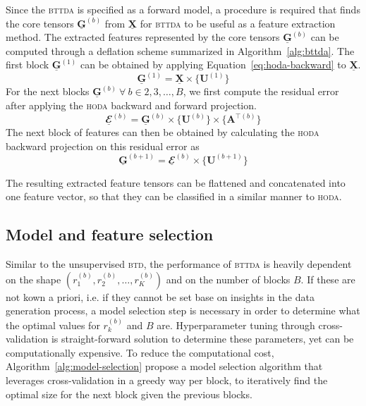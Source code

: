 \documentclass[twocolumn]{article}
\newcommand{\ten}[1]{\underline{\mathbf{#1}}} %
\newcommand{\mat}[1]{\mathbf{#1}} %
\newcommand{\mmpr}[1]{\times\{#1\}} %
\begin{document}
Since the \textsc{bttda} is specified as a forward model, a procedure is
required that finds the core tensors $\ten{G}^(b)$ from $\ten{X}$ for
\textsc{bttda} to be useful as a feature extraction method.
The extracted features represented by the core tensors $\ten{G}^{(b)}$ can be
computed through a deflation scheme summarized in Algorithm~\ref{alg:bttda}.
The first block $\ten{G}^{(1)}$ can be obtained by applying
Equation~\ref{eq:hoda-backward} to $\ten{X}$.
\begin{equation}
  \ten{G}^{(1)} = \ten{X}\mmpr{\mat{U}^{(1)}}
\end{equation}
For the next blocks $\ten{G}^{(b)}~\forall~ b\in2,3,\ldots,B$, we first compute
the residual error after applying the \textsc{hoda} backward and forward
projection.
\begin{equation}
  \ten{\mathbfcal{E}}^{(b)} =
  \ten{G}^{(b)}\mmpr{\mat{U}^{(b)}}\mmpr{\mat{A}^{\intercal(b)}}
\end{equation}
The next block of features can then be obtained by calculating the
\textsc{hoda} backward projection on this residual error as
\begin{equation}
  \ten{G}^{(b+1)} = \ten{\mathbfcal{E}}^{(b)}\mmpr{\mat{U}^{(b+1)}}
\end{equation}

The resulting extracted feature tensors can be flattened and concatenated into
one feature vector, so that they can be classified in a similar manner to
\textsc{hoda}.


\subsection{Model and feature selection}
Similar to the unsupervised \textsc{btd}, the performance of \textsc{bttda} is
heavily dependent on the shape $\left(r_1^{(b)}, r_2^{(b)}, \ldots,
r_K^{(b)}\right)$ and on the number of blocks $B$.
If these are not kown a priori, i.e. if they cannot be set base on insights in the
data generation process, a model selection step is necessary in order to
determine what the optimal values for $r_k^{(b)}$ and $B$ are.
Hyperparameter tuning through cross-validation is straight-forward solution to
determine these parameters, yet can be computationally expensive.
To reduce the computational cost, Algorithm~\ref{alg:model-selection} propose a model selection algorithm that
leverages cross-validation in a greedy way per block, to iteratively find the
optimal size for the next block given the previous blocks.
\end{document}

